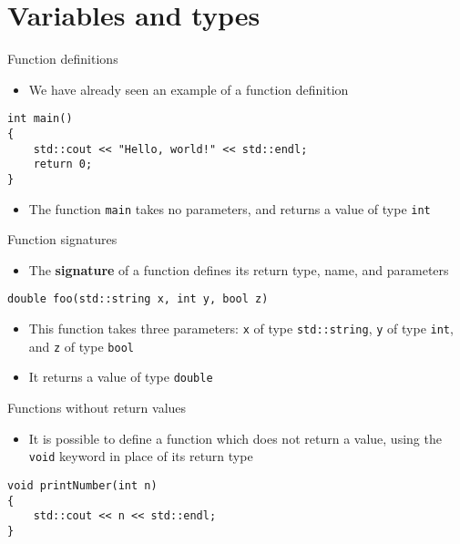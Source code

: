 \part{Variables and types}
\frame{\partpage}

\begin{frame}[fragile]{Function definitions}
    \begin{itemize}
        \item We have already seen an example of a function definition
    \end{itemize}
    \begin{lstlisting}
int main()
{
    std::cout << "Hello, world!" << std::endl;
    return 0;
}
    \end{lstlisting}
    \begin{itemize}
        \item The function \lstinline{main} takes no parameters, and returns a value of type \lstinline{int}
    \end{itemize}
\end{frame}

\begin{frame}[fragile]{Function signatures}
    \begin{itemize}
        \item The \textbf{signature} of a function defines its return type, name, and parameters
    \end{itemize}
    \begin{lstlisting}
double foo(std::string x, int y, bool z)
    \end{lstlisting}
    \pause
    \begin{itemize}
        \item This function takes three parameters: \pause
        \lstinline{x} of type \lstinline{std::string}, \pause
        \lstinline{y} of type \lstinline{int}, \pause
        and \lstinline{z} of type \lstinline{bool} \pause
        \item It returns a value of type \lstinline{double}
    \end{itemize}
\end{frame}

\begin{frame}[fragile]{Functions without return values}
    \begin{itemize}
        \item It is possible to define a function which does not return a value, using the \lstinline{void} keyword
        in place of its return type
    \end{itemize}
    \pause
    \begin{lstlisting}
void printNumber(int n)
{
    std::cout << n << std::endl;
}
    \end{lstlisting}
\end{frame}

